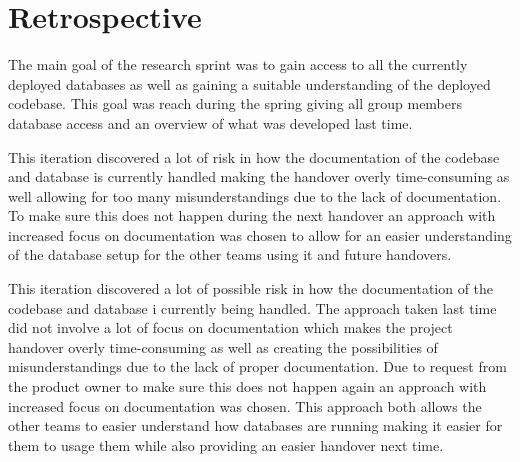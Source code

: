 \section{Retrospective}
The main goal of the research sprint was to gain access to all the currently deployed databases as well 
as gaining a suitable understanding of the deployed codebase. This goal was reach during the spring 
giving all group members database access and an overview of what was developed last time. 

This iteration discovered a lot of risk in how the documentation of the codebase and database is 
currently handled making the handover overly time-consuming as well allowing for too many 
misunderstandings due to the lack of documentation. To make sure this does not happen during the next 
handover an approach with increased focus on documentation was chosen to allow for an easier 
understanding of the database setup for the other teams using it and future handovers. 

This iteration discovered a lot of possible risk in how the documentation of the codebase and database i 
currently being handled. The approach taken last time did not involve a lot of focus on documentation 
which makes the project handover overly time-consuming as well as creating the possibilities of 
misunderstandings due to the lack of proper documentation. Due to request from the product owner to make 
sure this does not happen again an approach with increased focus on documentation was chosen. This 
approach both allows the other teams to easier understand how databases are running making it easier for 
them to usage them while also providing an easier handover next time.  



